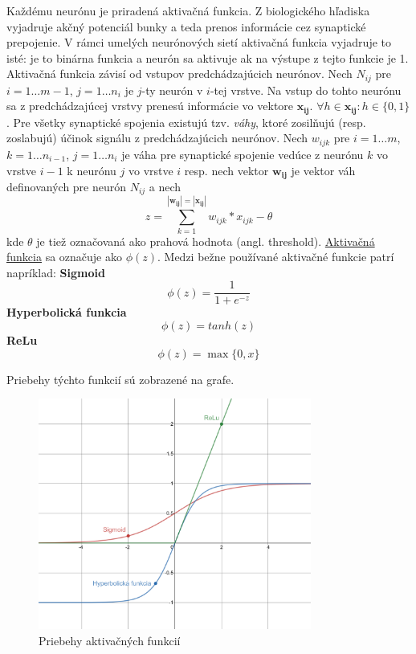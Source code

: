 Každému neurónu je priradená aktivačná funkcia.
Z biologického hľadiska vyjadruje akčný potenciál bunky a teda prenos informácie cez synaptické prepojenie.
V rámci umelých neurónových sietí aktivačná funkcia vyjadruje to isté: je to binárna funkcia a neurón sa aktivuje
ak na výstupe z tejto funkcie je 1.
Aktivačná funkcia závisí od vstupov predchádzajúcich neurónov.
Nech $N_{ij}$ pre $i = 1 \dots m-1$, $j = 1 \dots n_i$ je $j$-ty neurón v $i$-tej vrstve.
Na vstup do tohto neurónu sa z predchádzajúcej vrstvy prenesú informácie vo vektore $\pmb{x_{ij}}$.
$\forall h \in \pmb{x_{ij}} \colon h \in \{0, 1\}$.
Pre všetky synaptické spojenia existujú tzv. \emph{váhy}, ktoré zosilňujú (resp. zoslabujú) účinok signálu z
predchádzajúcich neurónov.
Nech $w_{ijk}$ pre $i=1 \dots m$, $k=1 \dots n_{i-1}$, $j=1 \dots n_i$ je váha pre synaptické spojenie vedúce z
neurónu $k$ vo vrstve $i-1$ k neurónu $j$ vo vrstve $i$ resp.
nech vektor $\pmb{w_{ij}}$ je vektor váh definovaných pre neurón $N_{ij}$ a nech
\begin{equation}
    z = \sum_{k=1}^{|\pmb{w_{ij}}|=|\pmb{x_{ij}}|}{w_{ijk} * x_{ijk}}-\theta
\end{equation}
kde $\theta$ je tiež označovaná ako prahová hodnota (angl. threshold).
\hyperref[figure:activation-functions]{Aktivačná funkcia} sa označuje ako $\phi(z)$.
Medzi bežne používané aktivačné funkcie patrí napríklad:
\linebreak
\textbf{Sigmoid}
\begin{equation}
    \phi(z) = \frac{1}{1+e^{-z}}
\end{equation}
\textbf{Hyperbolická funkcia}
\begin{equation}
    \phi(z) = tanh(z)
\end{equation}
\textbf{ReLu}
\begin{equation}
    \phi(z) = \max\{0, x\}
\end{equation}

Priebehy týchto funkcií sú zobrazené na grafe.
\begin{figure}[H]
    \centering
    \includegraphics[width=0.8\textwidth]{images/activation-functions.png}
    \caption{Priebehy aktivačných funkcií}
\end{figure}\label{figure:activation-functions}

